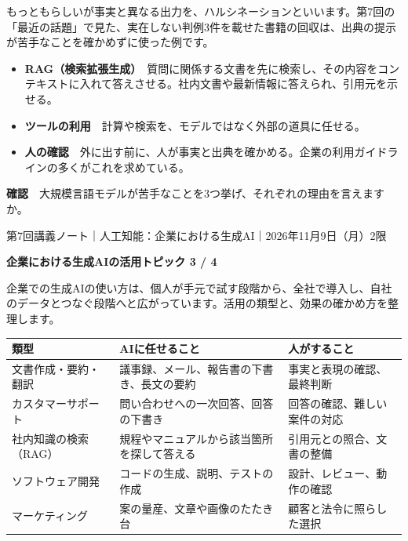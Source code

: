 \documentclass[paper=a4paper,fontsize=10pt,line_length=170mm,number_of_lines=46,baselineskip=1.6zw]{jlreq}
\newcommand\topichead[4]{%
  {\sffamily\footnotesize\color{grayt}#1\par}\vspace{1.5mm}
  {\sffamily\bfseries\LARGE #4}\hfill\colorbox{accent}{\sffamily\footnotesize\bfseries トピック #2 / #3}\par
  \vspace{1.2mm}{\color{ink}\hrule height 0.6pt}\vspace{3mm}}
\newcommand\subhead[1]{\par\vspace{2.6mm}{\sffamily\bfseries\large #1}\par\vspace{1.3mm}}
\begin{document}
もっともらしいが事実と異なる出力を、ハルシネーションといいます。第7回の「最近の話題」で見た、実在しない判例3件を載せた書籍の回収は、出典の提示が苦手なことを確かめずに使った例です。\par\vspace{1.2mm}
\subhead{苦手を補う方法}
\begin{itemize}[leftmargin=1.5em,itemsep=0.6mm,topsep=0.3mm]
\item {\sffamily\bfseries RAG（検索拡張生成）}　質問に関係する文書を先に検索し、その内容をコンテキストに入れて答えさせる。社内文書や最新情報に答えられ、引用元を示せる。
\item {\sffamily\bfseries ツールの利用}　計算や検索を、モデルではなく外部の道具に任せる。
\item {\sffamily\bfseries 人の確認}　外に出す前に、人が事実と出典を確かめる。企業の利用ガイドラインの多くがこれを求めている。
\end{itemize}\vspace{0.8mm}
\begin{checkbox}
{\sffamily\bfseries 確認}　大規模言語モデルが苦手なことを3つ挙げ、それぞれの理由を言えますか。\par
\end{checkbox}
\clearpage
\topichead{第7回講義ノート｜人工知能：企業における生成AI｜2026年11月9日（月）2限}{3}{4}{企業における生成AIの活用}
企業での生成AIの使い方は、個人が手元で試す段階から、全社で導入し、自社のデータとつなぐ段階へと広がっています。活用の類型と、効果の確かめ方を整理します。\par\vspace{1.2mm}
\subhead{活用の類型}
\begin{center}\small\renewcommand{\arraystretch}{1.15}\setlength{\tabcolsep}{1.5mm}
\begin{tabular}{|p{24.0mm}|p{68.0mm}|p{68.0mm}|}\arrayrulecolor{rulec}\hline
\rowcolor{papertwo}\sffamily\bfseries 類型 & \sffamily\bfseries AIに任せること & \sffamily\bfseries 人がすること\\\hline
文書作成・要約・翻訳 & 議事録、メール、報告書の下書き、長文の要約 & 事実と表現の確認、最終判断\\\hline
カスタマーサポート & 問い合わせへの一次回答、回答の下書き & 回答の確認、難しい案件の対応\\\hline
社内知識の検索（RAG） & 規程やマニュアルから該当箇所を探して答える & 引用元との照合、文書の整備\\\hline
ソフトウェア開発 & コードの生成、説明、テストの作成 & 設計、レビュー、動作の確認\\\hline
マーケティング & 案の量産、文章や画像のたたき台 & 顧客と法令に照らした選択\\\hline
\end{tabular}\end{center}\vspace{0.5mm}
\end{document}
